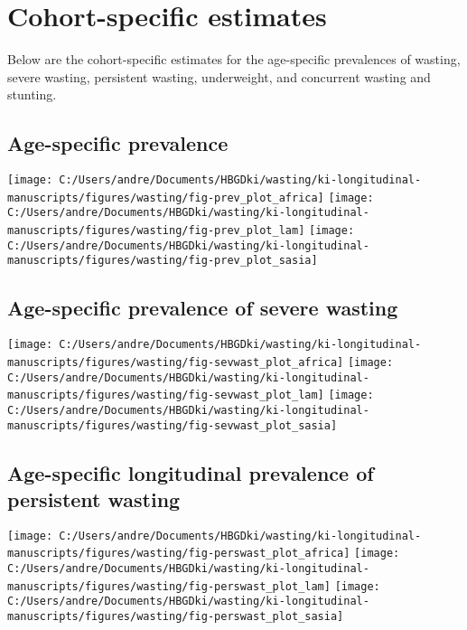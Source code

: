 \documentclass[
  9pt,
]{book}
\begin{document}
\hypertarget{cohort}{%
\chapter{Cohort-specific estimates}\label{cohort}}

\raggedright

Below are the cohort-specific estimates for the age-specific prevalences of wasting, severe wasting, persistent wasting, underweight, and concurrent wasting and stunting.

\hypertarget{age-specific-prevalence-1}{%
\section{Age-specific prevalence}\label{age-specific-prevalence-1}}

\texttt{[image: C:/Users/andre/Documents/HBGDki/wasting/ki-longitudinal-manuscripts/figures/wasting/fig-prev\_plot\_africa]}
\texttt{[image: C:/Users/andre/Documents/HBGDki/wasting/ki-longitudinal-manuscripts/figures/wasting/fig-prev\_plot\_lam]}
\texttt{[image: C:/Users/andre/Documents/HBGDki/wasting/ki-longitudinal-manuscripts/figures/wasting/fig-prev\_plot\_sasia]}

\hypertarget{age-specific-prevalence-of-severe-wasting-1}{%
\section{Age-specific prevalence of severe wasting}\label{age-specific-prevalence-of-severe-wasting-1}}

\texttt{[image: C:/Users/andre/Documents/HBGDki/wasting/ki-longitudinal-manuscripts/figures/wasting/fig-sevwast\_plot\_africa]}
\texttt{[image: C:/Users/andre/Documents/HBGDki/wasting/ki-longitudinal-manuscripts/figures/wasting/fig-sevwast\_plot\_lam]}
\texttt{[image: C:/Users/andre/Documents/HBGDki/wasting/ki-longitudinal-manuscripts/figures/wasting/fig-sevwast\_plot\_sasia]}

\hypertarget{age-specific-longitudinal-prevalence-of-persistent-wasting-1}{%
\section{Age-specific longitudinal prevalence of persistent wasting}\label{age-specific-longitudinal-prevalence-of-persistent-wasting-1}}

\texttt{[image: C:/Users/andre/Documents/HBGDki/wasting/ki-longitudinal-manuscripts/figures/wasting/fig-perswast\_plot\_africa]}
\texttt{[image: C:/Users/andre/Documents/HBGDki/wasting/ki-longitudinal-manuscripts/figures/wasting/fig-perswast\_plot\_lam]}
\texttt{[image: C:/Users/andre/Documents/HBGDki/wasting/ki-longitudinal-manuscripts/figures/wasting/fig-perswast\_plot\_sasia]}
\end{document}

